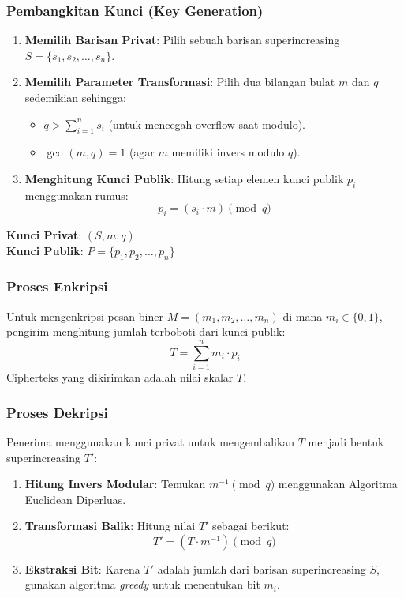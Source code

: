 \subsubsection{Pembangkitan Kunci (Key Generation)}
\begin{enumerate}
    \item \textbf{Memilih Barisan Privat}: Pilih sebuah barisan superincreasing $S = \{s_1, s_2, \dots, s_n\}$.
    \item \textbf{Memilih Parameter Transformasi}: Pilih dua bilangan bulat $m$ dan $q$ sedemikian sehingga:
    \begin{itemize}
        \item $q > \sum_{i=1}^n s_i$ (untuk mencegah overflow saat modulo).
        \item $\gcd(m, q) = 1$ (agar $m$ memiliki invers modulo $q$).
    \end{itemize}
    \item \textbf{Menghitung Kunci Publik}: Hitung setiap elemen kunci publik $p_i$ menggunakan rumus:
    \begin{equation}
      p_i = (s_i \cdot m) \pmod{q}
    \end{equation}
\end{enumerate}
\textbf{Kunci Privat}: $(S, m, q)$ \\
\textbf{Kunci Publik}: $P = \{p_1, p_2, \dots, p_n\}$

\subsubsection{Proses Enkripsi}
Untuk mengenkripsi pesan biner $M = (m_1, m_2, \dots, m_n)$ di mana $m_i \in \{0, 1\}$, pengirim menghitung jumlah terboboti dari kunci publik:
\begin{equation}
  T = \sum_{i=1}^{n} m_i \cdot p_i
\end{equation}
Cipherteks yang dikirimkan adalah nilai skalar $T$.

\subsubsection{Proses Dekripsi}
Penerima menggunakan kunci privat untuk mengembalikan $T$ menjadi bentuk superincreasing $T'$:
\begin{enumerate}
    \item \textbf{Hitung Invers Modular}: Temukan $m^{-1} \pmod{q}$ menggunakan Algoritma Euclidean Diperluas.
    \item \textbf{Transformasi Balik}: Hitung nilai $T'$ sebagai berikut:
    \begin{equation}
      T' = (T \cdot m^{-1}) \pmod{q}
    \end{equation}
    \item \textbf{Ekstraksi Bit}: Karena $T'$ adalah jumlah dari barisan superincreasing $S$, gunakan algoritma \textit{greedy} untuk menentukan bit $m_i$.
\end{enumerate}

